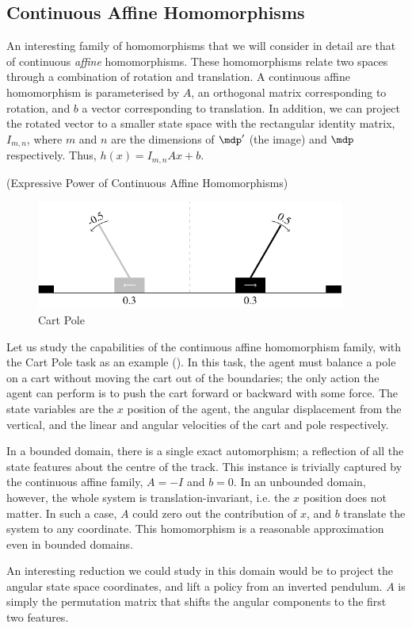 \subsection{Continuous Affine Homomorphisms}
\label{sec:hf:affine}

An interesting family of homomorphisms that we will consider in detail
are that of continuous {\em affine} homomorphisms. These homomorphisms
relate two spaces through a combination of rotation and translation.
A continuous affine homomorphism is parameterised by $A$, an
orthogonal matrix corresponding to rotation, and $b$ a vector
corresponding to translation. In addition, we can project the rotated
vector to a smaller state space with the rectangular identity matrix,
$I_{m,n}$, where $m$ and $n$ are the dimensions of $\mdp'$ (the image)
and $\mdp$ respectively. Thus, $h(x) = I_{m,n} A x + b$.

\begin{example}(Expressive Power of Continuous Affine Homomorphisms)
\begin{figure}[h]
  \centering
  \includegraphics[width=4in]{figures/cart-pole}
  \caption{Cart Pole}
  \label{fig:cart-pole} 
\end{figure}

Let us study the capabilities of the continuous affine homomorphism
family, with the Cart Pole task as an example ().
In this task, the agent must balance a pole on a cart without moving the
cart out of the boundaries; the only action the agent can perform is to
push the cart forward or backward with some force. The state variables
are the $x$ position of the agent, the angular displacement from the
vertical, and the linear and angular velocities of the cart and pole
respectively.

In a bounded domain, there is a single exact automorphism; a reflection
of all the state features about the centre of the track. This instance
is trivially captured by the continuous affine family, $A = -I$ and $b
= 0$. In an unbounded domain, however, the whole system is
translation-invariant, i.e. the $x$ position does not matter. In such
a case, $A$ could zero out the contribution of $x$, and $b$ translate
the system to any coordinate. This homomorphism is a reasonable
approximation even in bounded domains.

An interesting reduction we could study in this domain would be to
project the angular state space coordinates, and lift a policy from an
inverted pendulum. $A$ is simply the permutation matrix that shifts the
angular components to the first two features.
\end{example}

